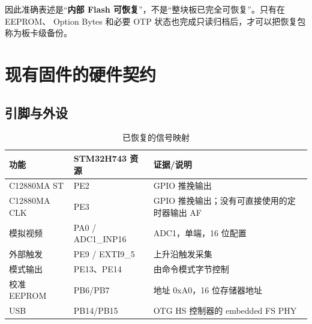 \documentclass[UTF8,fontset=windows,11pt]{ctexart}
\begin{document}
\begin{warningbox}
因此准确表述是“\textbf{内部 Flash 可恢复}”，不是“整块板已完全可恢复”。只有在 EEPROM、
Option Bytes 和必要 OTP 状态也完成只读归档后，才可以把恢复包称为板卡级备份。
\end{warningbox}

\section{现有固件的硬件契约}

\subsection{引脚与外设}

\begin{table}[htbp]
\centering
\caption{已恢复的信号映射}
\begin{tabular}{lll}
\toprule
功能 & STM32H743 资源 & 证据/说明\\
\midrule
C12880MA ST & PE2 & GPIO 推挽输出\\
C12880MA CLK & PE3 & GPIO 推挽输出；没有可直接使用的定时器输出 AF\\
模拟视频 & PA0 / ADC1\_INP16 & ADC1，单端，16 位配置\\
外部触发 & PE9 / EXTI9\_5 & 上升沿触发采集\\
模式输出 & PE13、PE14 & 由命令模式字节控制\\
校准 EEPROM & PB6/PB7 & 地址 0xA0，16 位存储器地址\\
USB & PB14/PB15 & OTG HS 控制器的 embedded FS PHY\\
\bottomrule
\end{tabular}
\end{table}
\end{document}
